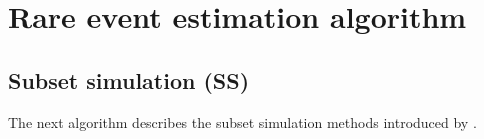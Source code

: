 \cleardoublepage
\chapter{Rare event estimation algorithm}
\label{apx:C}


\section*{Subset simulation (SS)}
The next algorithm describes the subset simulation methods introduced by \citet{AuBeck2001}. 

